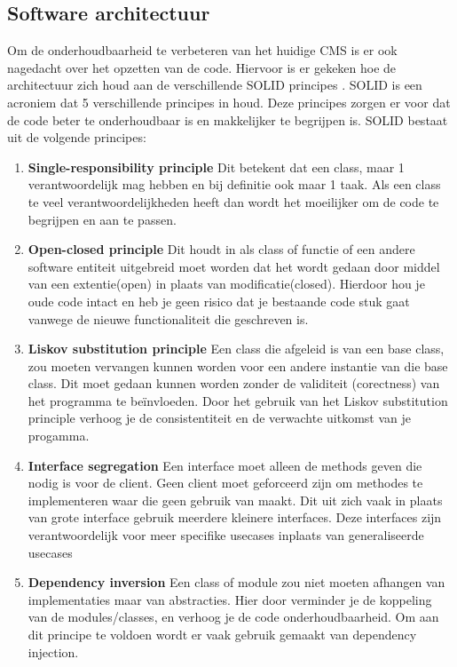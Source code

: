 \subsection{Software architectuur}
Om de onderhoudbaarheid te verbeteren van het huidige CMS is er ook nagedacht over het opzetten van de code.
Hiervoor is er gekeken hoe de architectuur zich houd aan de verschillende SOLID principes \parencite{SOLID}. 
SOLID is een acroniem dat 5 verschillende principes in houd.
Deze principes zorgen er voor dat de code beter te onderhoudbaar is en makkelijker te begrijpen is.
SOLID bestaat uit de volgende principes:

\begin{enumerate}
    \item \textbf{Single-responsibility principle}
    Dit betekent dat een class, maar 1 verantwoordelijk mag hebben en bij definitie ook maar 1 taak.
    Als een class te veel verantwoordelijkheden heeft dan wordt het moeilijker om de code te begrijpen en aan te passen.

    \item \textbf{Open-closed principle}
    Dit houdt in als class of functie of een andere software entiteit uitgebreid moet worden dat het wordt gedaan door middel van een extentie(open) in plaats van modificatie(closed).
    Hierdoor hou je oude code intact en heb je geen risico dat je bestaande code stuk gaat vanwege de nieuwe functionaliteit die geschreven is. 
        
    \item \textbf{Liskov substitution principle} 
    Een class die afgeleid is van een base class, zou moeten vervangen kunnen worden voor  een andere instantie van die base class.
    Dit moet gedaan kunnen worden zonder de validiteit (corectness) van het programma te beïnvloeden.
    Door het gebruik van het Liskov substitution principle verhoog je de consistentiteit en de verwachte uitkomst van je progamma.

    \item \textbf{Interface segregation} 
    Een interface moet alleen de methods geven die nodig is voor de client. 
    Geen client moet geforceerd zijn om methodes te implementeren waar die geen gebruik van maakt.
    Dit uit zich vaak in plaats van grote interface gebruik meerdere kleinere interfaces.
    Deze interfaces zijn verantwoordelijk voor meer specifike usecases inplaats van generaliseerde usecases

    \item \textbf{Dependency inversion} 
    Een class of module zou niet moeten afhangen van implementaties maar van abstracties.
    Hier door verminder je de koppeling van de modules/classes, en verhoog je de code onderhoudbaarheid.
    Om aan dit principe te voldoen wordt er vaak gebruik gemaakt van dependency injection.
\end{enumerate}


